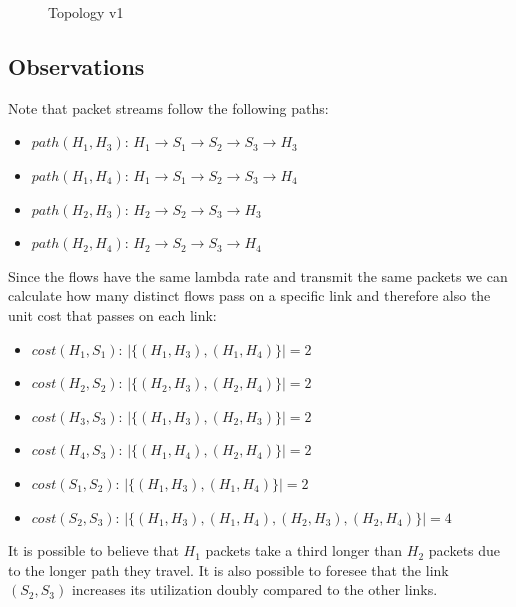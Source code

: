 \documentclass{article}
\begin{document}
\begin{figure}[H]
    \begin{center}
    \end{center}
    \caption{Topology v1}
    \label{fig:Topo1}
\end{figure}

\subsection{Observations}
\noindent Note that packet streams follow the following paths:
\begin{itemize}
    \item $path(H_1, H_3)$: $H_1 \rightarrow S_1 \rightarrow S_2 \rightarrow S_3 \rightarrow H_3$
    \item $path(H_1, H_4)$: $H_1 \rightarrow S_1 \rightarrow S_2 \rightarrow S_3 \rightarrow H_4$
    \item $path(H_2, H_3)$: $H_2 \rightarrow S_2 \rightarrow S_3 \rightarrow H_3$
    \item $path(H_2, H_4)$: $H_2 \rightarrow S_2 \rightarrow S_3 \rightarrow H_4$
\end{itemize}
Since the flows have the same lambda rate and transmit the same packets we can calculate how many distinct flows pass on a specific link and therefore also the unit cost that passes on each link:
\begin{itemize}
    \item $cost(H_1, S_1)$: $|\{(H_1, H_3), (H_1, H_4)\}| = 2$
    \item $cost(H_2, S_2)$: $|\{(H_2, H_3), (H_2, H_4)\}| = 2$
    \item $cost(H_3, S_3)$: $|\{(H_1, H_3), (H_2, H_3)\}| = 2$
    \item $cost(H_4, S_3)$: $|\{(H_1, H_4), (H_2, H_4)\}| = 2$
    \item $cost(S_1, S_2)$: $|\{(H_1, H_3), (H_1, H_4)\}| = 2$
    \item $cost(S_2, S_3)$: $|\{(H_1, H_3), (H_1, H_4), (H_2, H_3), (H_2, H_4)\}| = 4$
\end{itemize}
It is possible to believe that $H_1$ packets take a third longer than $H_2$ packets due to the longer path they travel. It is also possible to foresee that the link $(S_2, S_3)$ increases its utilization doubly compared to the other links.
\end{document}
